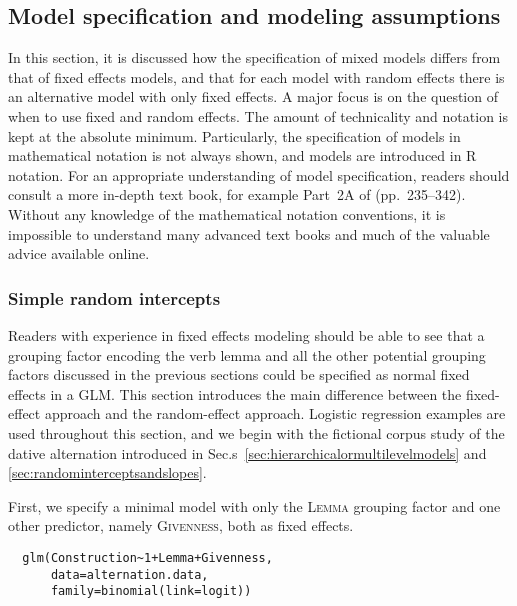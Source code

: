 \subsection{Model specification and modeling assumptions}
\label{sec:modelspecificationandmodelingassumptions}

In this section, it is discussed how the specification of mixed models differs from that of fixed effects models, and that for each model with random effects there is an alternative model with only fixed effects.
A major focus is on the question of when to use fixed and random effects.
The amount of technicality and notation is kept at the absolute minimum.
Particularly, the specification of models in mathematical notation is not always shown, and models are introduced in R notation.
For an appropriate understanding of model specification, readers should consult a more in-depth text book, for example Part~2A of \citet{GelmanHill2007} (pp.~235--342).
Without any knowledge of the mathematical notation conventions, it is impossible to understand many advanced text books and much of the valuable advice available online.

\subsubsection{Simple random intercepts}
\label{sec:simplerandomintercepts}

Readers with experience in fixed effects modeling should be able to see that a grouping factor encoding the verb lemma and all the other potential grouping factors discussed in the previous sections could be specified as normal fixed effects in a GLM.
This section introduces the main difference between the fixed-effect approach and the random-effect approach.
Logistic regression examples are used throughout this section, and we begin with the fictional corpus study of the dative alternation introduced in Sec.s~\ref{sec:hierarchicalormultilevelmodels} and \ref{sec:randominterceptsandslopes}.

First, we specify a minimal model with only the \textsc{Lemma} grouping factor and one other predictor, namely \textsc{Givenness}, both as fixed effects.

\begin{lstlisting}
  glm(Construction~1+Lemma+Givenness,
      data=alternation.data,
      family=binomial(link=logit))
\end{lstlisting}


